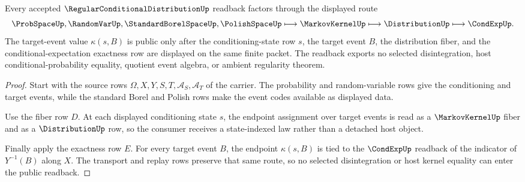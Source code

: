 \begin{theorem}
\label{thm:regular-conditional-distribution-kernel-readback}
Every accepted $\RegularConditionalDistributionUp$ readback factors through the displayed route
$$
\ProbSpaceUp,\RandomVarUp,\StandardBorelSpaceUp,\PolishSpaceUp
\longmapsto
\MarkovKernelUp
\longmapsto
\DistributionUp
\longmapsto
\CondExpUp.
$$
The target-event value $\kappa(s,B)$ is public only after the conditioning-state row $s$, the target event $B$, the distribution fiber, and the conditional-expectation exactness row are displayed on the same finite packet. The readback exports no selected disintegration, host conditional-probability equality, quotient event algebra, or ambient regularity theorem.
\end{theorem}
\begin{proof}
Start with the source rows $\Omega,X,Y,S,T,\mathcal{A}_S,\mathcal{A}_T$ of the carrier. The probability and random-variable rows give the conditioning and target events, while the standard Borel and Polish rows make the event codes available as displayed data.

Use the fiber row $D$. At each displayed conditioning state $s$, the endpoint assignment over target events is read as a $\MarkovKernelUp$ fiber and as a $\DistributionUp$ row, so the consumer receives a state-indexed law rather than a detached host object.

Finally apply the exactness row $E$. For every target event $B$, the endpoint $\kappa(s,B)$ is tied to the $\CondExpUp$ readback of the indicator of $Y^{-1}(B)$ along $X$. The transport and replay rows preserve that same route, so no selected disintegration or host kernel equality can enter the public readback.
\end{proof}

